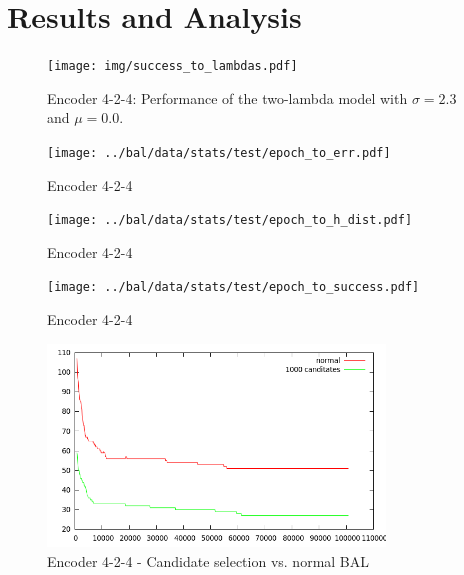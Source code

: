 
\section{Results and Analysis} 

\begin{figure}[t]
  \centering
  \texttt{[image: img/success\_to\_lambdas.pdf]}    
  \caption{Encoder 4-2-4: Performance of the two-lambda model with $\sigma = 2.3$ and $\mu = 0.0$.}
  \label{fig:424-lambdas}
\end{figure}


\begin{figure}[t]
  \centering
  \texttt{[image: ../bal/data/stats/test/epoch\_to\_err.pdf]}    
  \caption{Encoder 4-2-4}
  \label{fig:424-test1}
\end{figure}


\begin{figure}[t]
  \centering
  \texttt{[image: ../bal/data/stats/test/epoch\_to\_h\_dist.pdf]}    
  \caption{Encoder 4-2-4}
  \label{fig:424-test2}
\end{figure}

\begin{figure}[t]
  \centering
  \texttt{[image: ../bal/data/stats/test/epoch\_to\_success.pdf]}    
  \caption{Encoder 4-2-4}
  \label{fig:424-test2}
\end{figure}

\begin{figure}[t]
  \centering
  \includegraphics[width=0.8\textwidth]{../presentation/img/long_run_error.png}    
  \caption{Encoder 4-2-4 - Candidate selection vs. normal BAL}
  \label{fig:424-test2}
\end{figure}

